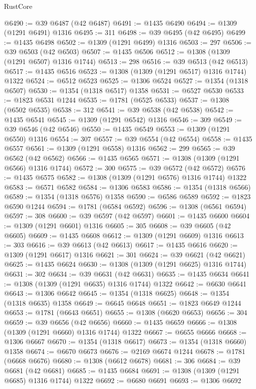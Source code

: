 \begin{lexlean}{RustCore}
\begin{coremodule}
@6490 := @39 @6487 (@42 @6487)
@6491 := @1435 @6490
@6494 := @1309 (@1291 @6491) @1316
@6495 := 311
@6498 := @39 @6495 (@42 @6495)
@6499 := @1435 @6498
@6502 := @1309 (@1291 @6499) @1316
@6503 := 297
@6506 := @39 @6503 (@42 @6503)
@6507 := @1435 @6506
@6512 := @1308 (@1309 (@1291 @6507) @1316 @1744)
@6513 := 298
@6516 := @39 @6513 (@42 @6513)
@6517 := @1435 @6516
@6523 := @1308 (@1309 (@1291 @6517) @1316 @1744) @1322
@6524 := @6512 @6523
@6525 := @1306 @6524
@6527 := @1354 (@1318 @6507)
@6530 := @1354 (@1318 @6517) @1358
@6531 := @6527 @6530
@6533 := @1823 @6531 @1244
@6535 := @1781 (@6525 @6533)
@6537 := @1308 (@6502 @6535)
@6538 := 312
@6541 := @39 @6538 (@42 @6538)
@6542 := @1435 @6541
@6545 := @1309 (@1291 @6542) @1316
@6546 := 309
@6549 := @39 @6546 (@42 @6546)
@6550 := @1435 @6549
@6553 := @1309 (@1291 @6550) @1316
@6554 := 307
@6557 := @39 @6554 (@42 @6554)
@6558 := @1435 @6557
@6561 := @1309 (@1291 @6558) @1316
@6562 := 299
@6565 := @39 @6562 (@42 @6562)
@6566 := @1435 @6565
@6571 := @1308 (@1309 (@1291 @6566) @1316 @1744)
@6572 := 300
@6575 := @39 @6572 (@42 @6572)
@6576 := @1435 @6575
@6582 := @1308 (@1309 (@1291 @6576) @1316 @1744) @1322
@6583 := @6571 @6582
@6584 := @1306 @6583
@6586 := @1354 (@1318 @6566)
@6589 := @1354 (@1318 @6576) @1358
@6590 := @6586 @6589
@6592 := @1823 @6590 @1244
@6594 := @1781 (@6584 @6592)
@6596 := @1308 (@6561 @6594)
@6597 := 308
@6600 := @39 @6597 (@42 @6597)
@6601 := @1435 @6600
@6604 := @1309 (@1291 @6601) @1316
@6605 := 305
@6608 := @39 @6605 (@42 @6605)
@6609 := @1435 @6608
@6612 := @1309 (@1291 @6609) @1316
@6613 := 303
@6616 := @39 @6613 (@42 @6613)
@6617 := @1435 @6616
@6620 := @1309 (@1291 @6617) @1316
@6621 := 301
@6624 := @39 @6621 (@42 @6621)
@6625 := @1435 @6624
@6630 := @1308 (@1309 (@1291 @6625) @1316 @1744)
@6631 := 302
@6634 := @39 @6631 (@42 @6631)
@6635 := @1435 @6634
@6641 := @1308 (@1309 (@1291 @6635) @1316 @1744) @1322
@6642 := @6630 @6641
@6643 := @1306 @6642
@6645 := @1354 (@1318 @6625)
@6648 := @1354 (@1318 @6635) @1358
@6649 := @6645 @6648
@6651 := @1823 @6649 @1244
@6653 := @1781 (@6643 @6651)
@6655 := @1308 (@6620 @6653)
@6656 := 304
@6659 := @39 @6656 (@42 @6656)
@6660 := @1435 @6659
@6666 := @1308 (@1309 (@1291 @6660) @1316 @1744) @1322
@6667 := @6655 @6666
@6668 := @1306 @6667
@6670 := @1354 (@1318 @6617)
@6673 := @1354 (@1318 @6660) @1358
@6674 := @6670 @6673
@6676 := @2169 @6674 @1244
@6678 := @1781 (@6668 @6676)
@6680 := @1308 (@6612 @6678)
@6681 := 306
@6684 := @39 @6681 (@42 @6681)
@6685 := @1435 @6684
@6691 := @1308 (@1309 (@1291 @6685) @1316 @1744) @1322
@6692 := @6680 @6691
@6693 := @1306 @6692

\end{coremodule}
\end{lexlean}
